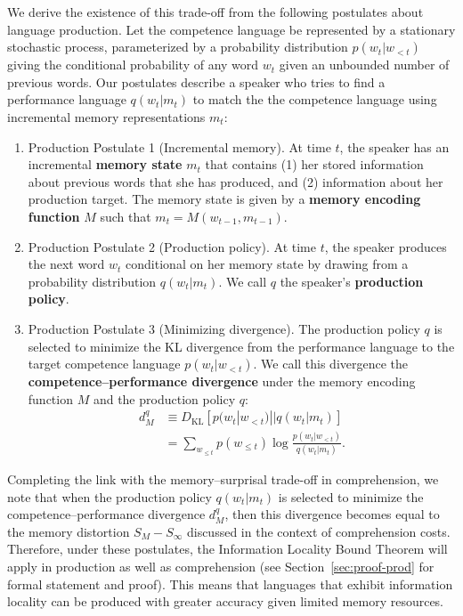 \documentclass[11pt,letterpaper]{article}
\newcommand{\key}[1]{\textbf{#1}}
\begin{document}
We derive the existence of this trade-off from the following postulates about language production. Let the competence language be represented by a stationary stochastic process, parameterized by a probability distribution $p(w_t | w_{<t})$ giving the conditional probability of any word $w_t$ given an unbounded number of previous words. Our postulates describe a speaker who tries to find a performance language $q(w_t|m_t)$ to match the the competence language using incremental memory representations $m_t$:

\begin{enumerate}
    \item Production Postulate 1 (Incremental memory). At time $t$, the speaker has an incremental \key{memory state} $m_t$ that contains (1) her stored information about previous words that she has produced, and (2) information about her production target. The memory state is given by a \key{memory encoding function} $M$ such that $m_t = M(w_{t-1}, m_{t-1})$.
    
    \item Production Postulate 2 (Production policy). At time $t$, the speaker produces the next word $w_t$ conditional on her memory state by drawing from a probability distribution $q(w_t | m_t)$. We call $q$ the speaker's \key{production policy}.
    
    \item Production Postulate 3 (Minimizing divergence). The production policy $q$ is selected to minimize the KL divergence from the performance language to the target competence language $p(w_t|w_{<t})$. We call this divergence the \key{competence--performance divergence} under the memory encoding function $M$ and the production policy $q$:
    \begin{align}
    \label{eq:comp-perf-div}
    d^q_M &\equiv D_{\text{KL}} [ p(w_t|w_{<t}) || q(w_t|m_t) ] \\
        &= \sum_{w_{\le t}} p(w_{\le t}) \log \frac{p(w_t | w_{<t})}{q(w_t|m_t)}.
    \end{align}
\end{enumerate}

Completing the link with the memory--surprisal trade-off in comprehension, we note that when the production policy $q(w_t|m_t)$ is selected to minimize the competence--performance divergence $d^q_M$, then this divergence becomes equal to the memory distortion $S_M-S_\infty$ discussed in the context of comprehension costs. Therefore, under these postulates, the Information Locality Bound Theorem will apply in production as well as comprehension (see Section~\ref{sec:proof-prod} for formal statement and proof). This means that languages that exhibit information locality can be produced with greater accuracy given limited memory resources.
\end{document}
